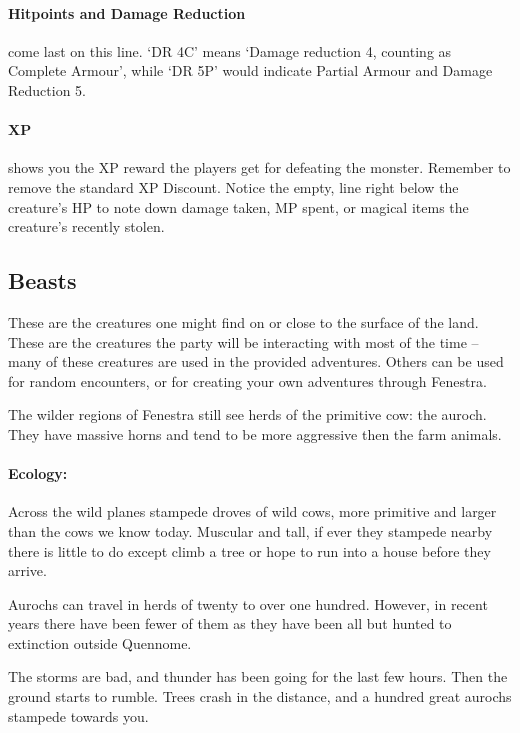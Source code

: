 \begin{multicols}{2}
\paragraph{Hitpoints and Damage Reduction} come last on this line.  `DR 4C' means `Damage reduction 4, counting as Complete Armour', while `DR 5P' would indicate Partial Armour and Damage Reduction 5.

\paragraph{XP} shows you the XP reward the players get for defeating the monster.  Remember to remove the standard XP Discount.  Notice the empty, line right below the creature's HP to note down damage taken, MP spent, or magical items the creature's recently stolen.

\subsection{Beasts}

These are the creatures one might find on or close to the surface of the land.
These are the creatures the party will be interacting with most of the time -- many of these creatures are used in the provided adventures.
Others can be used for random encounters, or for creating your own adventures through Fenestra.

\label{auroch}

The wilder regions of Fenestra still see herds of the primitive cow: the auroch.
They have massive horns and tend to be more aggressive then the farm animals.


\paragraph{Ecology:} Across the wild planes stampede droves of wild cows, more primitive and larger than the cows we know today.  Muscular and tall, if ever they stampede nearby there is little to do except climb a tree or hope to run into a house before they arrive.

Aurochs can travel in herds of twenty to over one hundred.  However, in recent years there have been fewer of them as they have been all but hunted to extinction outside Quennome.

\begin{boxtext}

	The storms are bad, and thunder has been going for the last few hours.  Then the ground starts to rumble.  Trees crash in the distance, and a hundred great aurochs stampede towards you.


\end{boxtext}
\end{multicols}
